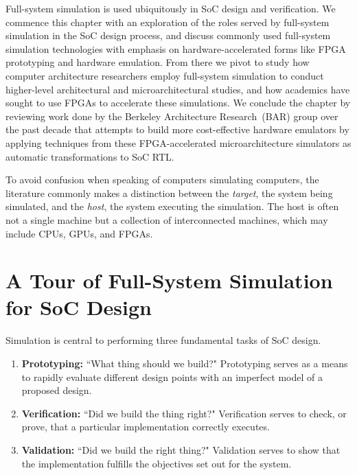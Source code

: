 Full-system simulation is used ubiquitously in SoC design and verification. We commence this chapter
with an exploration of the roles served by full-system simulation
in the SoC design process, and discuss commonly used full-system
simulation technologies with emphasis on hardware-accelerated forms like FPGA
prototyping and hardware emulation. From there we pivot to study how computer
architecture researchers employ full-system simulation to conduct higher-level
architectural and microarchitectural studies, and how academics have sought to
use FPGAs to accelerate these simulations.
We conclude the chapter by reviewing work done by the Berkeley Architecture
Research~(BAR) group over the past decade that attempts to build more
cost-effective hardware emulators by applying techniques from these
FPGA-accelerated microarchitecture simulators as automatic transformations to
SoC RTL.

To avoid confusion when speaking of computers simulating computers, the
literature commonly makes a distinction between the \emph{target}, the system
being simulated, and the \emph{host}, the system
executing the simulation. The host is often not a single machine but
a collection of interconnected machines, which may include CPUs,
GPUs, and FPGAs.

\section{A Tour of Full-System Simulation for SoC Design}

Simulation is central to performing three fundamental tasks of SoC design.

\begin{enumerate}

    \item \textbf{Prototyping:} ``What thing should we
        build?" Prototyping serves as a means to rapidly evaluate different
        design points with an imperfect model of a proposed design.

    \item \textbf{Verification:} ``Did we build the thing right?" Verification
        serves to check, or prove, that a particular implementation
        correctly executes.

    \item \textbf{Validation:} ``Did we build the right thing?" Validation
        serves to show that the implementation fulfills the objectives set out
        for the system.

\end{enumerate}


